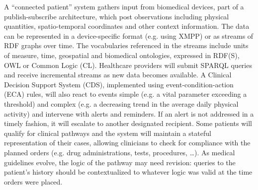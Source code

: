 \documentclass[runningheads]{llncs}
\begin{document}
A ``connected patient'' system gathers input from biomedical devices, part of a publish-subscribe architecture, which post observations including physical quantities, spatio-temporal coordinates and other context information. 
The data can be represented in a device-specific format (e.g. using XMPP\cite{XMPP}) or as streams of RDF graphs over time. 
The vocabularies referenced in the streams include units of measure, time, geospatial and biomedical ontologies, expressed in RDF(S), OWL or Common Logic (CL). 
Healthcare providers will submit SPARQL queries and receive incremental streams as new data becomes available. 
A Clinical Decision Support System (CDS), implemented using event-condition-action (ECA) rules, will also react to events simple (e.g. a vital parameter exceeding a threshold) and complex (e.g. a decreasing trend in the average daily physical activity) and intervene with alerts and reminders. 
If an alert is not addressed in a timely fashion, it will escalate to another designated recipient. 
Some patients will qualify for clinical pathways and the system will maintain a stateful representation of their cases, allowing clinicians to check for compliance with the planned orders (e.g. drug administrations, tests, procedures, \dots). 
As medical guidelines evolve, the logic of the pathway may need revision: queries to the patient's history should be contextualized to whatever logic was valid at the time orders were placed.
\end{document}
